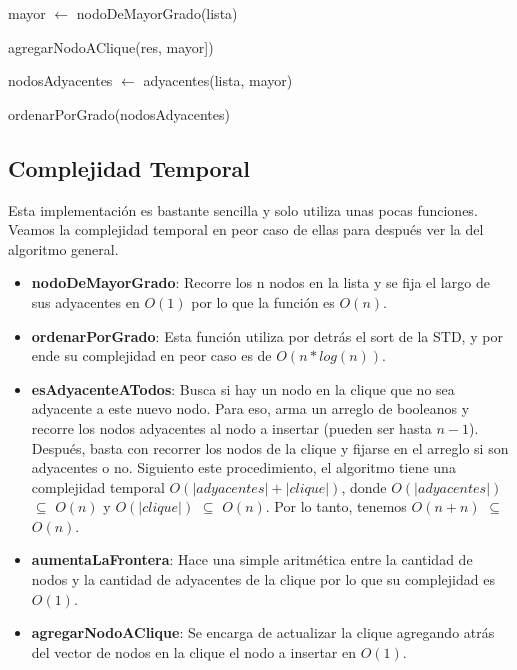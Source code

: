 \begin{algorithm}[H]
	\NoCaptionOfAlgo
	\caption{}

    mayor $\leftarrow$ nodoDeMayorGrado(lista)

    agregarNodoAClique(res, mayor])

    nodosAdyacentes $\leftarrow$ adyacentes(lista, mayor)

    ordenarPorGrado(nodosAdyacentes)

\end{algorithm}

\subsection{Complejidad Temporal}

Esta implementación es bastante sencilla y solo utiliza unas pocas funciones. Veamos la complejidad temporal en peor caso de ellas para después ver la del algoritmo general.

\begin{itemize}
    \item \textbf{nodoDeMayorGrado}: Recorre los n nodos en la lista y se fija el largo de sus adyacentes en $O(1)$ por lo que la función es $O(n)$.

	\item \textbf{ordenarPorGrado}: Esta función utiliza por detrás el sort de la STD, y por ende su complejidad en peor caso es de $O(n*log(n))$.

    \item \textbf{esAdyacenteATodos}: Busca si hay un nodo en la clique que no sea adyacente a este nuevo nodo. Para eso, arma un arreglo de booleanos y recorre los nodos adyacentes al nodo a insertar (pueden ser hasta $n-1$). Después, basta con recorrer los nodos de la clique y fijarse en el arreglo si son adyacentes o no. Siguiento este procedimiento, el algoritmo tiene una complejidad temporal $O(|adyacentes| + |clique|)$, donde $O(|adyacentes|)$ $\subseteq$ $O(n)$ y $O(|clique|)$ $\subseteq$ $O(n)$. Por lo tanto, tenemos $O(n + n)$  $\subseteq$ $O(n)$.

    \item \textbf{aumentaLaFrontera}: Hace una simple aritmética entre la cantidad de nodos y la cantidad de adyacentes de la clique por lo que su complejidad es $O(1)$.

    \item \textbf{agregarNodoAClique}: Se encarga de actualizar la clique agregando atrás del vector de nodos en la clique el nodo a insertar en $O(1)$.

\end{itemize}

